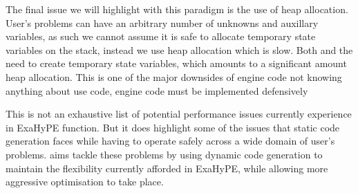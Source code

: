 The final issue we will highlight with this paradigm is the use of heap allocation.
User's problems can have an arbitrary number of unknowns and auxillary variables, 
as such we cannot assume it is safe to allocate temporary state variables on the stack, instead we use heap allocation which is slow.
Both  and the  need to create temporary state variables, which amounts to a significant amount heap allocation.
This is one of the major downsides of engine code not knowing anything about use code, engine code must be implemented defensively


This is not an exhaustive list of potential performance issues currently experience in ExaHyPE  function.
But it does highlight some of the issues that static code generation faces while having to operate safely across a wide domain of user's problems.
\phlat aims tackle these problems by using dynamic code generation to maintain the flexibility currently afforded in ExaHyPE, while allowing more aggressive optimisation to take place.
